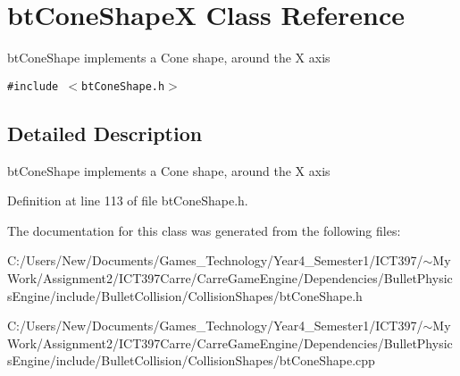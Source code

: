 \hypertarget{classbt_cone_shape_x}{
\section{btConeShapeX Class Reference}
\label{classbt_cone_shape_x}
}
btConeShape implements a Cone shape, around the X axis  


{\tt \#include $<$btConeShape.h$>$}



\subsection{Detailed Description}
btConeShape implements a Cone shape, around the X axis 

Definition at line 113 of file btConeShape.h.

The documentation for this class was generated from the following files:\begin{CompactItemize}
\item 
C:/Users/New/Documents/Games\_\-Technology/Year4\_\-Semester1/ICT397/$\sim$My Work/Assignment2/ICT397Carre/CarreGameEngine/Dependencies/BulletPhysicsEngine/include/BulletCollision/CollisionShapes/btConeShape.h\item 
C:/Users/New/Documents/Games\_\-Technology/Year4\_\-Semester1/ICT397/$\sim$My Work/Assignment2/ICT397Carre/CarreGameEngine/Dependencies/BulletPhysicsEngine/include/BulletCollision/CollisionShapes/btConeShape.cpp\end{CompactItemize}
